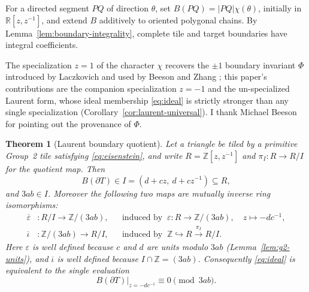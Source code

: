 \documentclass[11pt]{amsart}
\newtheorem{theorem}{Theorem}
\theoremstyle{definition}
\theoremstyle{remark}
\newcommand{\Z}{\mathbb Z}
\begin{document}
For a directed segment $PQ$ of direction $\theta$, set
$B(PQ)=|PQ|\chi(\theta)$, initially in
$\mathbb R[z,z^{-1}]$, and extend $B$ additively to oriented polygonal
chains.  By Lemma~\ref{lem:boundary-integrality}, complete tile and target
boundaries have integral coefficients.

The specialization $z=1$ of the character $\chi$ recovers the $\pm1$
boundary invariant $\Phi$ introduced by Laczkovich
\cite[p.~351]{Lacz12} and used by Beeson and Zhang \cite[\S4.2]{BZRat};
this paper's contributions are the companion specialization $z=-1$ and
the un-specialized Laurent form, whose ideal membership
\eqref{eq:ideal} is strictly stronger than any single specialization
(Corollary~\ref{cor:laurent-universal}).  I thank Michael Beeson for
pointing out the provenance of $\Phi$.

\begin{theorem}[Laurent boundary quotient]\label{thm:laurent}
Let a triangle be tiled by a primitive Group~2 tile satisfying
\eqref{eq:eisenstein}, and write $R=\Z[z,z^{-1}]$ and
$\pi_I:R\to R/I$ for the quotient map.  Then
\begin{equation}\label{eq:ideal}
       B(\partial T)\in I=(d+cz,\ d+cz^{-1})\subseteq R,
\end{equation}
and $3ab\in I$.  Moreover the following two maps are mutually inverse ring
isomorphisms:
\begin{equation}\label{eq:quotient}
\begin{aligned}
 \overline\varepsilon&:R/I\longrightarrow\Z/(3ab),
  &&\text{induced by }\ \varepsilon:R\to\Z/(3ab),\quad z\longmapsto-dc^{-1},\\
 \overline\iota&:\Z/(3ab)\longrightarrow R/I,
  &&\text{induced by }\ \Z\hookrightarrow R\xrightarrow{\ \pi_I\ }R/I .
\end{aligned}
\end{equation}
Here $\varepsilon$ is well defined because $c$ and $d$ are units modulo $3ab$
(Lemma~\ref{lem:g2-units}), and $\overline\iota$ is well defined because
$I\cap\Z=(3ab)$.  Consequently \eqref{eq:ideal} is equivalent to the single
evaluation
\begin{equation}\label{eq:eval}
       B(\partial T)\big|_{z=-dc^{-1}}\equiv0\pmod{3ab}.
\end{equation}
\end{theorem}
\end{document}

